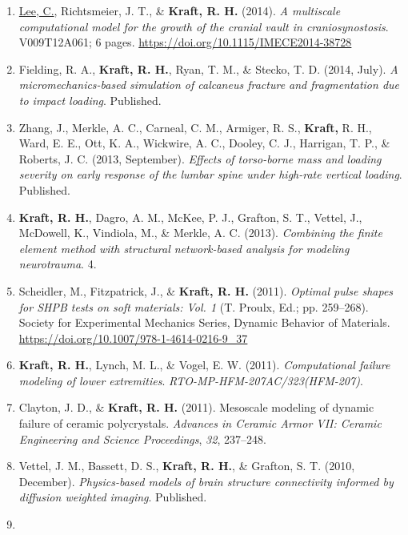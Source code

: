 \documentclass[11pt]{article}
\begin{document}
\begin{enumerate}
{  micromechanical model of intervertebral disc degeneration under cyclic
  loading}. 
V003T03A012; 7 pages.
  \url{https://doi.org/10.1115/IMECE2014-39174}
\item
  \underline{Lee, C.}, Richtsmeier, J. 
T., \& \textbf{\textbf{Kraft,} R. 
H.} (2014). 
\emph{A
  multiscale computational model for the growth of the cranial vault in
  craniosynostosis}. 
V009T12A061; 6 pages.
  \url{https://doi.org/10.1115/IMECE2014-38728}
\item
  Fielding, R. 
A., \textbf{\textbf{Kraft,} R. 
H.}, Ryan, T. 
M., \& Stecko, T. 
D. 
(2014,
  July). 
\emph{A micromechanics-based simulation of calcaneus fracture
  and fragmentation due to impact loading}. 
Published.
\item
  Zhang, J., Merkle, A. 
C., Carneal, C. 
M., Armiger, R. 
S., \textbf{Kraft,} R.
  H., Ward, E. 
E., Ott, K. 
A., Wickwire, A. 
C., Dooley, C. 
J., Harrigan,
  T. 
P., \& Roberts, J. 
C. 
(2013, September). 
\emph{Effects of
  torso-borne mass and loading severity on early response of the lumbar
  spine under high-rate vertical loading}. 
Published.
\item
  \textbf{\textbf{Kraft,} R. 
H.}, Dagro, A. 
M., McKee, P. 
J., Grafton, S. 
T., Vettel, J.,
  McDowell, K., Vindiola, M., \& Merkle, A. 
C. 
(2013). 
\emph{Combining
  the finite element method with structural network-based analysis for
  modeling neurotrauma}. 
4.
\item
  Scheidler, M., Fitzpatrick, J., \& \textbf{\textbf{Kraft,} R. 
H.} (2011). 
\emph{Optimal
  pulse shapes for SHPB tests on soft materials: Vol. 
1} (T. 
Proulx,
  Ed.; pp. 
259--268). 
Society for Experimental Mechanics Series, Dynamic
  Behavior of Materials.
  \url{https://doi.org/10.1007/978-1-4614-0216-9_37}
\item
  \textbf{\textbf{Kraft,} R. 
H.}, Lynch, M. 
L., \& Vogel, E. 
W. 
(2011).
  \emph{Computational failure modeling of lower extremities}.
  \emph{RTO-MP-HFM-207AC/323(HFM-207)}.
\item
  Clayton, J. 
D., \& \textbf{\textbf{Kraft,} R. 
H.} (2011). 
Mesoscale modeling of dynamic
  failure of ceramic polycrystals. 
\emph{Advances in Ceramic Armor VII:
  Ceramic Engineering and Science Proceedings}, \emph{32}, 237--248.
\item
  Vettel, J. 
M., Bassett, D. 
S., \textbf{\textbf{Kraft,} R. 
H.}, \& Grafton, S. 
T. 
(2010,
  December). 
\emph{Physics-based models of brain structure connectivity
  informed by diffusion weighted imaging}. 
Published.
\item

\end{enumerate}
\end{document}
